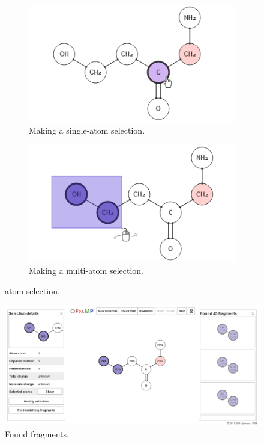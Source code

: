 \begin{figure}
\centering
\begin{subfigure}[t]{0.45\textwidth}
\centering
\includegraphics[width=\textwidth]{img/select_1.png}
\caption{Making a single-atom selection.}
\end{subfigure}%
\qquad
\begin{subfigure}[t]{0.45\textwidth}
\centering
\includegraphics[width=\textwidth]{img/select_2.png}
\caption{Making a multi-atom selection.}
\end{subfigure}
\caption{\oframp{} atom selection.}
\end{figure}

\begin{figure}
\center
\includegraphics[width=.9\textwidth]{img/find_1.png}
\caption{Found fragments.}
\end{figure}

